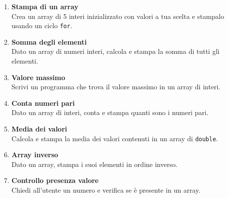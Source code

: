 \documentclass{article}
\begin{document}
\begin{enumerate}
    \item \textbf{Stampa di un array} \\
    Crea un array di 5 interi inizializzato con valori a tua scelta e stampalo usando un ciclo \texttt{for}.

    \item \textbf{Somma degli elementi} \\
    Dato un array di numeri interi, calcola e stampa la somma di tutti gli elementi.

    \item \textbf{Valore massimo} \\
    Scrivi un programma che trova il valore massimo in un array di interi.

    \item \textbf{Conta numeri pari} \\
    Dato un array di interi, conta e stampa quanti sono i numeri pari.

    \item \textbf{Media dei valori} \\
    Calcola e stampa la media dei valori contenuti in un array di \texttt{double}.

    \item \textbf{Array inverso} \\
    Dato un array, stampa i suoi elementi in ordine inverso.

    \item \textbf{Controllo presenza valore} \\
    Chiedi all'utente un numero e verifica se è presente in un array.
\end{enumerate}
\end{document}
